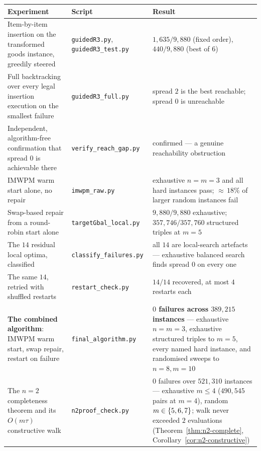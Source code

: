\begin{center}
\begin{tabular}{@{}p{}p{}p{}@{}}
\toprule
Experiment & Script & Result \\
\midrule
Item-by-item insertion on the transformed goods instance, greedily steered
  & \texttt{guidedR3.py}, \texttt{guidedR3\_test.py} & $1{,}635/9{,}880$
    (fixed order), $440/9{,}880$ (best of $6$) \\
Full backtracking over every legal insertion execution on the smallest
failure
  & \texttt{guidedR3\_full.py} & spread $2$ is the best reachable; spread $0$
    is unreachable \\
Independent, algorithm-free confirmation that spread $0$ is achievable there
  & \texttt{verify\_reach\_gap.py} & confirmed --- a genuine reachability
    obstruction \\
IMWPM warm start alone, no repair
  & \texttt{imwpm\_raw.py} & exhaustive $n=m=3$ and all hard instances pass;
    ${\approx}\,18\%$ of larger random instances fail \\
Swap-based repair from a round-robin start alone
  & \texttt{targetGbal\_local.py} & $9{,}880/9{,}880$ exhaustive;
    $357{,}746/357{,}760$ structured triples at $m=5$ \\
The $14$ residual local optima, classified
  & \texttt{classify\_failures.py} & all $14$ are local-search artefacts ---
    exhaustive balanced search finds spread $0$ on every one \\
The same $14$, retried with shuffled restarts
  & \texttt{restart\_check.py} & $14/14$ recovered, at most $4$ restarts each \\
\textbf{The combined algorithm}: IMWPM warm start, swap repair, restart on
failure
  & \texttt{final\_algorithm.py} & \textbf{$0$ failures across $389{,}215$
    instances} --- exhaustive $n=m=3$, exhaustive structured triples to $m=5$,
    every named hard instance, and randomised sweeps to $n=8,m=10$ \\
The $n=2$ completeness theorem and its $O(m\tau)$ constructive walk
  & \texttt{n2proof\_check.py} & $0$ failures over $521{,}310$ instances ---
    exhaustive $m \le 4$ ($490{,}545$ pairs at $m=4$), random $m \in
    \left\{5,6,7\right\}$; walk never exceeded $2$ evaluations
    (Theorem~\ref{thm:n2-complete}, Corollary~\ref{cor:n2-constructive}) \\
\bottomrule
\end{tabular}
\end{center}

